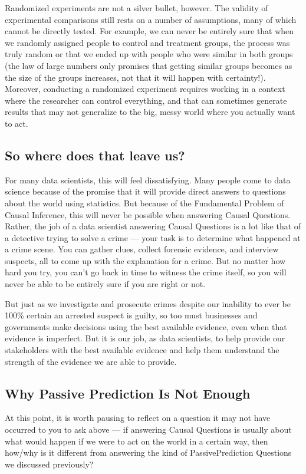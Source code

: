 \documentclass[letterpaper,10pt,english]{jupyterBook}
\begin{document}
\sphinxAtStartPar
Randomized experiments are not a silver bullet, however. The validity of experimental comparisons still rests on a number of assumptions, many of which cannot be directly tested. For example, we can never be entirely sure that when we randomly assigned people to control and treatment groups, the process was truly random or that we ended up with people who were similar in both groups (the law of large numbers only promises that getting similar groups becomes  as the size of the groups increases, not that it will happen with certainty!). Moreover, conducting a randomized experiment requires working in a context where the researcher can control everything, and that can sometimes generate results that may not generalize to the big, messy world where you actually want to act.


\subsection{So where does that leave us?}
\label{\detokenize{30_questions/40_answering_causal_questions:so-where-does-that-leave-us}}
\sphinxAtStartPar
For many data scientists, this will feel  dissatisfying. Many people come to data science because of the promise that it will provide direct answers to questions about the world using statistics. But because of the Fundamental Problem of Causal Inference, this will never be possible when answering Causal Questions. Rather, the job of a data scientist answering Causal Questions is a lot like that of a detective trying to solve a crime — your task is to determine what  happened at a crime scene. You can gather clues, collect forensic evidence, and interview suspects, all to come up with the  explanation for a crime. But no matter how hard you try, you can’t go back in time to witness the crime itself, so you will never be able to be entirely sure if you are right or not.

\sphinxAtStartPar
But just as we investigate and prosecute crimes despite our inability to ever be 100\% certain an arrested suspect is guilty, so too must businesses and governments make decisions using the best available evidence, even when that evidence is imperfect. But it is our job, as data scientists, to help provide our stakeholders with the best available evidence and help them understand the strength of the evidence we are able to provide.


\subsection{Why Passive Prediction Is Not Enough}
\label{\detokenize{30_questions/40_answering_causal_questions:why-passive-prediction-is-not-enough}}
\sphinxAtStartPar
At this point, it is worth pausing to reflect on a question it may not have occurred to you to ask above — if answering Causal Questions is usually about  what would happen if we were to act on the world in a certain way, then how/why is it different from answering the kind of Passive\sphinxhyphen{}Prediction Questions we discussed previously?
\end{document}
